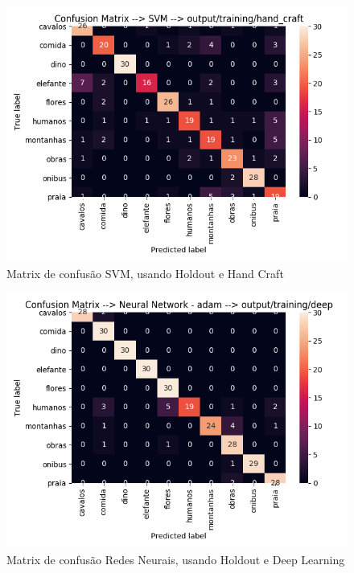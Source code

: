 \documentclass[
article,			%
11pt,				%
oneside,			%
a4paper,			%
english,			%
brazil,				%
sumario=tradicional,
]{abntex2}
\begin{document}
\begin{anexosenv}
	\begin{figure}[htb]
	\caption{\label{confusion-matrix-svm-holdout-hand-craft}Matrix de confusão SVM, usando Holdout e Hand Craft}
	\begin{center}
		\includegraphics[scale=0.5]{confusion-matrix-svm-hodoult-hand-craft.png}
	\end{center}
\end{figure}

\begin{figure}[htb]
	\caption{\label{confusion-matrix-neural-network-hodoult-deep}Matrix de confusão Redes Neurais, usando Holdout e Deep Learning}
	\begin{center}
		\includegraphics[scale=0.5]{confusion-matrix-neural-network-hodoult-deep.png}
	\end{center}
\end{figure}


\end{anexosenv}
\end{document}
